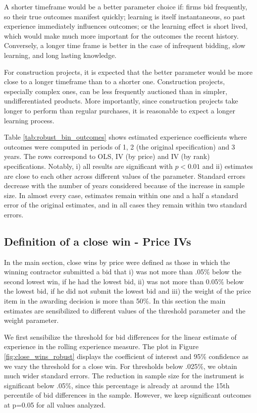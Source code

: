 A shorter timeframe would be a better parameter choice if: firms bid frequently, so their true outcomes manifest quickly;  learning is itself instantaneous,  so past experience immediately influences outcomes; or  the learning effect is short lived, which would make much more important for the outcomes the recent history. Conversely, a longer time frame is better in the case of infrequent bidding, slow learning, and long lasting knowledge.

For construction projects, it is expected that the better parameter would be more close to a longer timeframe than to a shorter one. Construction projects, especially complex ones, can be less frequently auctioned than in simpler, undifferentiated products. More importantly, since construction projects take longer to perform than regular purchases, it is reasonable to expect a longer learning process.

Table \ref{tab:robust_bin_outcomes} shows estimated experience coefficients where outcomes were computed in periods of 1, 2 (the original specification) and 3 years. The rows correspond to OLS, IV (by price) and IV (by rank) specifications. Notably, i) all results are significant with $p<0.01$ and ii) estimates are close to each other across different values of the parameter. Standard errors decrease with the number of years considered because of the increase in sample size. In almost every case, estimates remain within one and a half a standard error of the original estimates, and in all cases they remain within two standard errors.


\subsection{Definition of a close win - Price IVs}
In the main section, close wins by price were defined as those in which the winning contractor submitted a bid that i) was not more than .05\% below the second lowest win, if he had the lowest bid, ii) was not more than 0.05\% below the lowest bid, if he did not submit the lowest bid and iii) the weight of the price item in the awarding decision is more than 50\%. In this section the main estimates are sensibilized to different values of the threshold parameter and the weight parameter.

We first sensibilize the threshold for bid differences for the linear estimate of experience in the rolling experience measure. The plot in Figure \ref{fig:close_wins_robust} displays the coefficient of interest and 95\% confidence as we vary the threshold for a close win.  For thresholds below .025\%, we obtain much wider standard errors. The reduction in sample size for the instrument is significant below .05\%, since this percentage is already at around the 15th percentile of bid differences in the sample. However, we keep significant outcomes at p=0.05 for all values analyzed.

